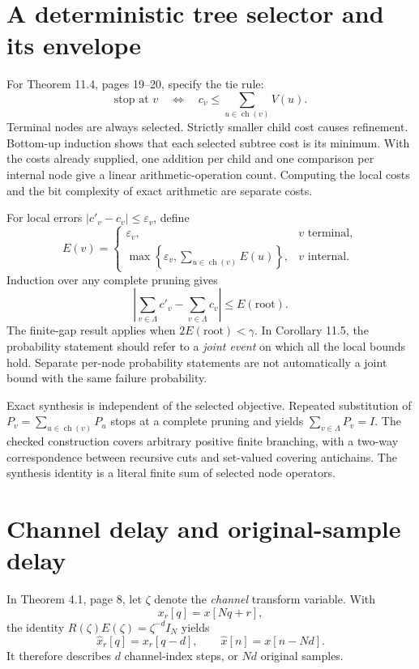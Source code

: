 \documentclass[11pt]{article}
\begin{document}
\section{A deterministic tree selector and its envelope}
For Theorem 11.4, pages 19--20, specify the tie rule:
\[
\text{stop at }v\quad\Longleftrightarrow\quad
c_v\le\sum_{u\in\operatorname{ch}(v)}V(u).
\]
Terminal nodes are always selected. Strictly smaller child cost causes refinement. Bottom-up induction shows that each selected subtree cost is its minimum. With the costs already supplied, one addition per child and one comparison per internal node give a linear arithmetic-operation count. Computing the local costs and the bit complexity of exact arithmetic are separate costs.

For local errors $|c'_v-c_v|\le\varepsilon_v$, define
\[
E(v)=
\begin{cases}
\varepsilon_v,&v\text{ terminal},\\
\max\left\{\varepsilon_v,\sum_{u\in\operatorname{ch}(v)}E(u)\right\},&v\text{ internal}.
\end{cases}
\]
Induction over any complete pruning gives
\[
\left|\sum_{v\in\Lambda}c'_v-\sum_{v\in\Lambda}c_v\right|\le E(\mathrm{root}).
\]
The finite-gap result applies when $2E(\mathrm{root})<\gamma$. In Corollary 11.5, the probability statement should refer to a \emph{joint event} on which all the local bounds hold. Separate per-node probability statements are not automatically a joint bound with the same failure probability.

Exact synthesis is independent of the selected objective. Repeated substitution of $P_v=\sum_{u\in\operatorname{ch}(v)}P_u$ stops at a complete pruning and yields $\sum_{v\in\Lambda}P_v=I$. The checked construction covers arbitrary positive finite branching, with a two-way correspondence between recursive cuts and set-valued covering antichains. The synthesis identity is a literal finite sum of selected node operators.

\section{Channel delay and original-sample delay}
In Theorem 4.1, page 8, let $\zeta$ denote the \emph{channel} transform variable. With
\[
x_r[q]=x[Nq+r],
\]
the identity $R(\zeta)E(\zeta)=\zeta^{-d}I_N$ yields
\[
\widehat x_r[q]=x_r[q-d],\qquad
\widehat x[n]=x[n-Nd].
\]
It therefore describes $d$ channel-index steps, or $Nd$ original samples.
\end{document}

